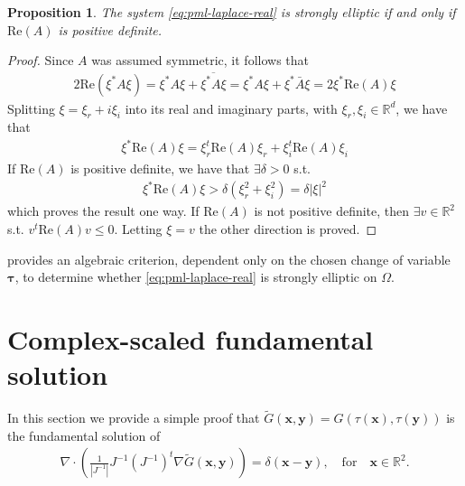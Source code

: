 \documentclass[11pt]{article}
\newcommand{\R}{\mathbb{R}}
\newcommand{\bx}{\mathbf{x}}
\newcommand{\btau}{\boldsymbol{\tau}}
\newcommand{\by}{\mathbf{y}}
\newtheorem{proposition}[theorem]{Proposition}
\begin{document}
\begin{proposition}
  \label{pr:algebraic-condition-strongly-elliptic}
  The system \cref{eq:pml-laplace-real} is strongly elliptic if and only if
  $\mathrm{Re}(A)$ is positive definite.
\end{proposition}
\begin{proof}
  Since $A$ was assumed symmetric, it follows that
  \begin{align}
  2 \mathrm{Re}(\xi^* A \xi) = \xi^* A \xi + \overline{\xi^* A \xi}= \xi^* A \xi + \xi^* \bar{A} \xi = 2 \xi^* \mathrm{Re}(A) \xi
  \end{align}
  Splitting $\xi = \xi_r + i\xi_i$ into its real and imaginary parts, with
  $\xi_r,\xi_i \in \R^d$, we have that
  \begin{align}
  \xi^* \mathrm{Re}(A) \xi = \xi_r^t \mathrm{Re}(A) \xi_r + \xi_i^t \mathrm{Re}(A) \xi_i
  \end{align}
  If $\mathrm{Re}(A)$ is positive definite, we have that $\exists \delta > 0$ s.t.
  \begin{align}
  \xi^* \mathrm{Re}(A) \xi > \delta (\xi_r^2 + \xi_i^2) = \delta |\xi|^2
  \end{align}
  which proves the result one way. If $\mathrm{Re}(A)$ is not positive definite,
  then $\exists v \in \R^2$ s.t. $v^t \mathrm{Re}(A) v \leq 0$. Letting $\xi = v$
  the other direction is proved.
\end{proof}

 provides an algebraic criterion,
dependent only on the chosen change of variable $\btau$, to determine whether
\cref{eq:pml-laplace-real} is strongly elliptic on $\Omega$. 

\section{Complex-scaled fundamental solution}\label{sec:fundamental-solution}

In this section we provide a simple proof that $\tilde{G}(\bx,\by) =G(\tau(\bx),\tau(\by))$ is the fundamental solution of
\begin{align}
  \nabla \cdot \left( \frac{1}{|J^{-1}|}J^{-1}(J^{-1})^t \nabla \tilde{G}(\bx,\by) \right) = \delta(\bx - \by),
  \quad \mbox{for} \quad \bx \in \R^2.
\end{align}


\end{document}
